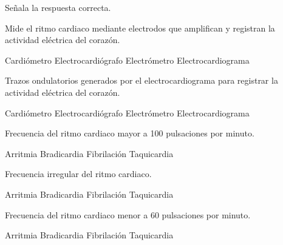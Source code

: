 Señala la respuesta correcta.
\begin{parts}
    Mide el ritmo cardiaco mediante electrodos que amplifican y registran la actividad eléctrica del corazón.
    \begin{choices}
        \choice Cardiómetro
        \choice Electrocardiógrafo
        \choice Electrómetro
        \choice Electrocardiograma
    \end{choices}
    Trazos ondulatorios generados por el electrocardiograma para registrar la actividad eléctrica del corazón.
    \begin{choices}
        \choice Cardiómetro
        \choice Electrocardiógrafo
        \choice Electrómetro
        \choice Electrocardiograma
    \end{choices}
    Frecuencia del ritmo cardiaco mayor a 100 pulsaciones por minuto.
    \begin{choices}
        \choice Arritmia
        \choice Bradicardia
        \choice Fibrilación
        \choice Taquicardia
    \end{choices}
    Frecuencia irregular del ritmo cardiaco.
    \begin{choices}
        \choice Arritmia
        \choice Bradicardia
        \choice Fibrilación
        \choice Taquicardia
    \end{choices}
    Frecuencia del ritmo cardiaco menor a 60 pulsaciones por minuto.
    \begin{choices}
        \choice Arritmia
        \choice Bradicardia
        \choice Fibrilación
        \choice Taquicardia
    \end{choices}
\end{parts}